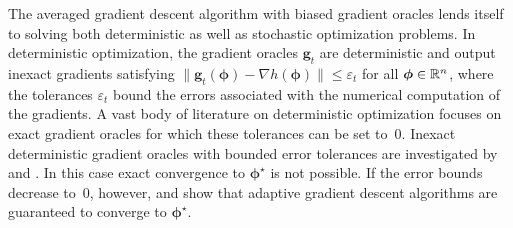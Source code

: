 \documentclass[11pt, a4paper, oneside, reqno]{article}
\begin{document}
	The averaged gradient descent algorithm with biased gradient oracles lends itself to solving both deterministic as well as stochastic optimization problems. In deterministic optimization, the gradient oracles $\bm g_t$ are deterministic and output inexact gradients satisfying $\| \bm g_t(\bm \phi) - \nabla h(\bm \phi) \| \leq \varepsilon_t$ for all $\bm \phi\in \mathbb{R}^n$, where the tolerances $\varepsilon_t$ bound the errors associated with the numerical computation of the gradients. A vast body of literature on deterministic optimization focuses on exact gradient oracles for which these tolerances can be set to~$0$. Inexact deterministic gradient oracles with bounded error tolerances are investigated by \citet{nedic2001convergence} and \citet{d2008smooth}. In this case exact convergence to $\bm \phi^\star$ is not possible. If the error bounds decrease to~$0$, however, \citet{luo1993error, schmidt2011convergence} and \citet{friedlander2012hybrid} show that adaptive gradient descent algorithms are guaranteed to converge to $\bm \phi^\star$.
	
\end{document}
